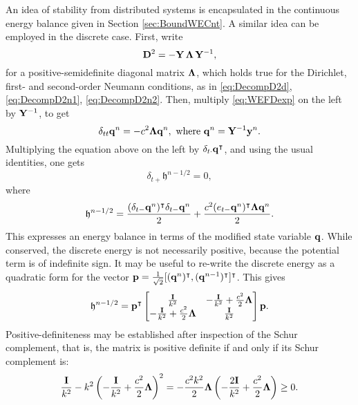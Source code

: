 \documentclass[11pt,twoside,a4paper,english]{book}
\newcommand{\etm}{e_{t-}}
\newcommand{\dtp}{\delta_{t+}}
\newcommand{\dtm}{\delta_{t-}}
\newcommand{\dtd}{\delta_{t\cdot}}
\newcommand{\dtt}{\delta_{tt}}
\begin{document}
An idea of stability from distributed systems is encapsulated in the continuous energy balance given in Section \ref{sec:BoundWECnt}. A similar idea can be employed in the discrete case. First, write
\begin{equation}
{\bf D}^2 = -{\bf Y} \, {\bf \Lambda} \, {\bf Y}^{-1},
\end{equation}
for a positive-semidefinite diagonal matrix ${\bf \Lambda}$, which holds true for the Dirichlet, first- and second-order Neumann conditions, as in \eqref{eq:DecompD2d}, \eqref{eq:DecompD2n1}, \eqref{eq:DecompD2n2}. Then, multiply \eqref{eq:WEFDexp} on the left by ${\bf Y}^{-1}$, to get
\begin{equation}
\dtt {\bf q}^n = -c^2 {\bf \Lambda} {\bf q}^n, \,\, \text{where }{\bf q}^n = {\bf Y}^{-1}{\bf y}^n.
\end{equation}
Multiplying the equation above on the left by $\dtd {\bf q}^\intercal$, and using the usual identities, one gets
\begin{equation}
\dtp {\mathfrak h}^{n-1/2} = 0,
\end{equation}
where
\begin{equation}\label{eq:EnWaveEqnFD}
{\mathfrak h}^{n-1/2} = \frac{(\dtm {\bf q}^n)^\intercal \dtm {\bf q}^n}{2} + \frac{c^2(\etm {\bf q}^n)^\intercal {\bf \Lambda} {\bf q}^n}{2}.
\end{equation}
This expresses an energy balance in terms of the modified state variable $\bf q$. While conserved, the discrete energy is not necessarily positive, because the potential term is of indefinite sign. It may be useful to re-write the discrete energy as a quadratic form for the vector ${\bf p} = \frac{1}{\sqrt{2}}[({\bf q}^n)^\intercal, ({\bf q}^{n-1})^\intercal]^\intercal$. This gives
\begin{equation}
{\mathfrak h}^{n-1/2} = {\bf p}^\intercal \begin{bmatrix}\frac{\bf I}{k^2} & -\frac{\bf I}{k^2}+\frac{c^2}{2}{\bf \Lambda} \\ -\frac{\bf I}{k^2}+\frac{c^2}{2}{\bf \Lambda} & \frac{\bf I}{k^2} \end{bmatrix}{\bf p}.
\end{equation}
Positive-definiteness may be established after inspection of the Schur complement, that is, the matrix is positive definite if and only if its Schur complement is:
\begin{equation}
\frac{\bf I}{k^2} - k^2 \left( -\frac{\bf I}{k^2}+\frac{c^2}{2}{\bf \Lambda}\right)^2 = -\frac{c^2k^2}{2}{\bf \Lambda}\left(-\frac{2{\bf I}}{k^2} + \frac{c^2}{2}{\bf \Lambda} \right) \geq 0.
\end{equation}
\end{document}
